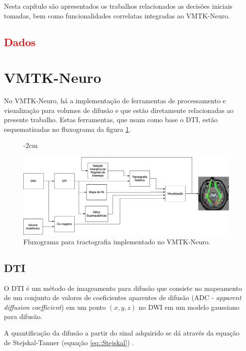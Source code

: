 \documentclass[
    12pt,                %
    oneside,            %
    a4paper,            %
    english,            %
    french,                %
    spanish,            %
    brazil                %
    ]{abntex2}
\begin{document}
Nesta capítulo são apresentados os trabalhos relacionados as decisões iniciais tomadas, bem como funcionalidades correlatas integradas ao VMTK-Neuro.

\textcolor{red}{
\section{Dados}
}

\section{VMTK-Neuro}
\label{AlgoritmosVMTK}


No VMTK-Neuro, há a implementação de ferramentas de processamento e visualização para volumes de difusão e que estão diretamente relacionadas ao presente trabalho. Estas ferramentas, que usam como base o DTI, estão esquematizadas no fluxograma da figura \ref{fig::PipelineDTI_tracto}.

\begin{figure}[ht]
   \centering
       \addtolength{\leftskip} {-2cm} %
    \addtolength{\rightskip}{-2cm}

    \centering
    \includegraphics[width=1.0\linewidth, angle=0]{figs/Fluxogramas/PipelineDTI_tracto.jpg}
    \caption{Fluxograma para tractografia implementado no VMTK-Neuro.}
    \label{fig::PipelineDTI_tracto}
\end{figure}

\pagebreak
\subsection{DTI}
O DTI é um método de imageamento para difusão que consiste no mapeamento de um conjunto de valores de coeficientes aparentes de difusão (ADC - \textit{apparent diffusion coefficient}) em um ponto $(x, y, z)$ no DWI em um modelo gaussiano para difusão. 

A quantificação da difusão a partir do sinal adquirido se dá através da equação de Stejskal-Tanner (equação \ref{eq::Stejskal}) \cite{DTI_Handbook}.
\end{document}
